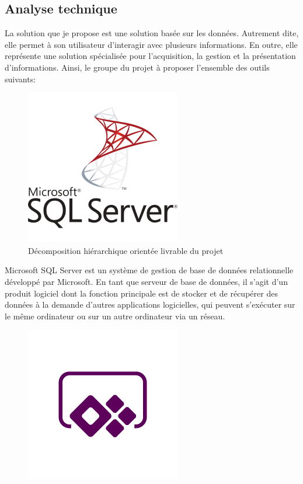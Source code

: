 \documentclass[a4paper]{report}
\begin{document}
\begin{doublespace}
	\section{Analyse technique}
	La solution que je propose est une solution basée sur les données.
	Autrement dite, elle permet à son utilisateur d'interagir avec plusieurs
	informations. En outre, elle représente une solution spécialisée pour
	l'acquisition, la gestion et la présentation d'informations. Ainsi, le groupe du projet à proposer l'ensemble des outils suivants:
	\begin{figure}[H]
		\begin{center}
			\includegraphics[scale=0.41]{images/outilsDB.png}
			\caption{Décomposition hiérarchique orientée livrable du projet}
		\end{center}
	\end{figure}
	Microsoft SQL Server est un système de gestion
	de base de données relationnelle développé
	par Microsoft. En tant que serveur de base de
	données, il s'agit d'un produit logiciel dont la
	fonction principale est de stocker et de
	récupérer des données à la demande d'autres
	applications logicielles, qui peuvent
	s'exécuter sur le même ordinateur ou sur un
	autre ordinateur via un réseau.
	\begin{figure}[H]
		\begin{center}
			\includegraphics[scale=0.41]{images/outilsDEV.png}

\end{center}
\end{figure}
\end{doublespace}
\end{document}
